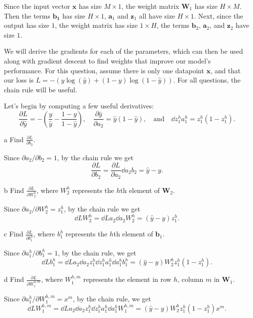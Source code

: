 \documentclass[expanded]{lkx_pset}
\begin{document}
\begin{solution}
\begin{parts}
		Since the input vector $\mathbf{x}$ has size $M\times 1$, the weight matrix $\mathbf{W}_1$ has size $H\times M$. Then the terms $\mathbf{b_1}$ has size $H\times 1$, $\mathbf{a}_1$ and $\mathbf{z}_1$ all have size $H\times 1$. Next, since the output has size $1$, the weight matrix has size $1\times H$, the terms $\mathbf{b}_2$, $\mathbf{a}_2$, and $\mathbf{z}_2$ have size $1$.
	\end{parts}

	\begin{part}{2}
		We will derive the gradients for each of the parameters, which can then be used along with gradient descent to find weights that improve our model's performance. For this question, assume there is only one datapoint $\mathbf{x}$, and that our loss is $L = -(y \log (\hat{y}) + (1 - y) \log (1 - \hat{y}))$. For all questions, the chain rule will be useful.
	\end{part}
	\begin{solution}
		Let's begin by computing a few useful derivatives:
		\[
			\frac{\partial L}{\partial \widehat{y}} = -\left(\frac{y}{\widehat{y}}-\frac{1-y}{1-\widehat{y}}\right),\quad \frac{\partial \widehat{y}}{\partial a_2} = \widehat{y}(1-\widehat{y}),\quad \textrm{and}\quad\dd{z_1^h}{a_1^h} = z_1^h(1-z_1^h).
		\]
		\begin{part}{a} Find $\frac{\partial L}{\partial b_2}$.\end{part}
		Since $\partial a_2 / \partial b_2 = 1$, by the chain rule we get
		\[
			\frac{\partial L}{\partial b_2} = \frac{\partial L}{\partial a_2}\dd{a_2}{b_2}=\widehat{y}-y.
		\]
		\begin{part}{b} Find $\frac{\partial L}{\partial W_2^h}$, where $W_2^h$ represents the $h$th element of $\mathbf{W}_2$.\end{part}
		Since $\partial a_2/\partial W_2^h = z_1^h$, by the chain rule we get
		\[
			\dd{L}{W^h_2} = \dd{L}{a_2}\dd{a_2}{W_2^h} = (\widehat{y}-y)z_1^h.
		\]

		\begin{part}{c} Find $\frac{\partial L}{\partial b_1^h}$, where $b_1^h$ represents the $h$th element of $\mathbf{b}_1$.\end{part}
		Since $\partial a_1^h/\partial b_1^h=1$, by the chain rule, we get
		\[
			\dd{L}{b_1^h} = \dd{L}{a_2}\dd{a_2}{z_1^h}\dd{z_1^h}{a_1^h}\dd{a_1^h}{b_1^h} = (\widehat{y}-y)W_2^h z_1^h(1-z_1^h).
		\]

		\begin{part}{d} Find $\frac{\partial L}{\partial W_1^{h,m}}$, where  $W_1^{h,m}$ represents the element in row $h$, column $m$ in $\mathbf{W}_1$.\end{part}
		Since $\partial a_1^h/\partial W_1^{h,m}=x^m$, by the chain rule, we get
		\[
			\dd{L}{W_1^{h,m}} = \dd{L}{a_2}\dd{a_2}{z_1^h}\dd{z_1^h}{a_1^h}\dd{a_1^h}{W_1^{h,m}} = (\widehat{y}-y)W_2^h z_1^h(1-z_1^h)x^m.
		\]
	\end{solution}


\end{solution}
\end{document}
